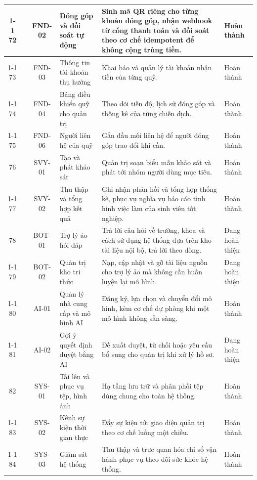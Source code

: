 \documentclass[12pt,a4paper,oneside]{report}
\begin{document}
\begin{landscape}
\begin{longtable}{|c|>{\raggedright\arraybackslash}p{3.1cm}|c|>{\raggedright\arraybackslash}p{4.6cm}|>{\raggedright\arraybackslash}p{8.4cm}|>{\raggedright\arraybackslash}p{2.4cm}|}
\cline{1-1}\cline{3-6}
72 &  & FND-02 & Đóng góp và đối soát tự động & Sinh mã QR riêng cho từng khoản đóng góp, nhận webhook từ cổng thanh toán và đối soát theo cơ chế idempotent để không cộng trùng tiền. & Hoàn thành \\
\cline{1-1}\cline{3-6}
73 &  & FND-03 & Thông tin tài khoản thụ hưởng & Khai báo và quản lý tài khoản nhận tiền của từng quỹ. & Hoàn thành \\
\cline{1-1}\cline{3-6}
74 &  & FND-04 & Bảng điều khiển quỹ cho quản trị & Theo dõi tiến độ, lịch sử đóng góp và thống kê của từng chiến dịch. & Hoàn thành \\
\cline{1-1}\cline{3-6}
75 & \multirow{-5}{2.4cm}{\textbf{Gây quỹ}} & FND-06 & Người liên hệ của quỹ & Gắn đầu mối liên hệ để người đóng góp trao đổi khi cần. & Hoàn thành \\
\hline
76 &  & SVY-01 & Tạo và phát khảo sát & Quản trị soạn biểu mẫu khảo sát và phát tới nhóm người dùng mục tiêu. & Hoàn thành \\
\cline{1-1}\cline{3-6}
77 & \multirow{-2}{2.4cm}{\textbf{Khảo sát}} & SVY-02 & Thu thập và tổng hợp kết quả & Ghi nhận phản hồi và tổng hợp thống kê, phục vụ nghĩa vụ báo cáo tình hình việc làm của sinh viên tốt nghiệp. & Hoàn thành \\
\hline
78 &  & BOT-01 & Trợ lý ảo hỏi đáp & Trả lời câu hỏi về trường, khoa và cách sử dụng hệ thống dựa trên kho tài liệu nội bộ, trả lời theo dòng. & Đang hoàn thiện \\
\cline{1-1}\cline{3-6}
79 &  & BOT-02 & Quản trị kho tri thức & Nạp, cập nhật và gỡ tài liệu nguồn cho trợ lý ảo mà không cần huấn luyện lại mô hình. & Đang hoàn thiện \\
\cline{1-1}\cline{3-6}
80 &  & AI-01 & Quản lý nhà cung cấp và mô hình AI & Đăng ký, lựa chọn và chuyển đổi mô hình, kèm cơ chế dự phòng khi một mô hình không sẵn sàng. & Hoàn thành \\
\cline{1-1}\cline{3-6}
81 & \multirow{-4}{2.4cm}{\textbf{Trợ lý ảo và AI}} & AI-02 & Gợi ý quyết định duyệt bằng AI & Đề xuất duyệt, từ chối hoặc yêu cầu bổ sung cho quản trị khi xử lý hồ sơ. & Đang hoàn thiện \\
\hline
82 &  & SYS-01 & Tải lên và phục vụ tệp, hình ảnh & Hạ tầng lưu trữ và phân phối tệp dùng chung cho toàn hệ thống. & Hoàn thành \\
\cline{1-1}\cline{3-6}
83 &  & SYS-02 & Kênh sự kiện thời gian thực & Đẩy sự kiện tới giao diện quản trị theo cơ chế luồng một chiều. & Hoàn thành \\
\cline{1-1}\cline{3-6}
84 & \multirow{-3}{2.4cm}{\textbf{Nền tảng dùng chung}} & SYS-03 & Giám sát hệ thống & Thu thập và trực quan hóa chỉ số vận hành phục vụ theo dõi sức khỏe hệ thống. & Hoàn thành \\

\end{longtable}
\end{landscape}
\end{document}
